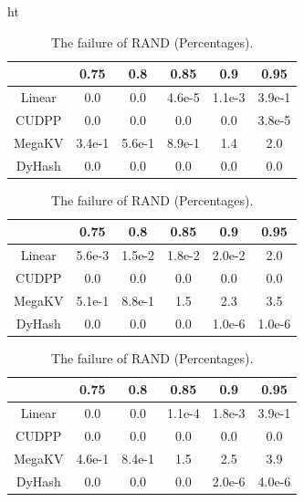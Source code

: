 \begin{table}{ht}\centering
	\begin{minipage}{0.45\linewidth}\centering
		\caption{The failure of TW (Percentages).}
		\begin{tabular}{|c|c|c|c|c|c|}
			\hline
			& 0.75 & 0.8 & 0.85 & 0.9 & 0.95\\ \hline
			Linear &0.0 & 0.0 &4.6e-5  & 1.1e-3 & 3.9e-1 \\ \hline
			CUDPP & 0.0 & 0.0 &0.0  & 0.0 & 3.8e-5 \\ \hline
			MegaKV & 3.4e-1 & 5.6e-1 &8.9e-1 & 1.4 & 2.0 \\ \hline
			DyHash &0.0 & 0.0 &0.0  & 0.0 & 0.0 \\ \hline
		\end{tabular}
		\label{tab:fail:tw}
	\end{minipage}
	\begin{minipage}{0.45\linewidth}\centering
		\caption{The failure of RE (Percentages).}
		\begin{tabular}{|c|c|c|c|c|c|}
			\hline
			& 0.75 & 0.8 & 0.85 & 0.9 & 0.95\\ \hline
			Linear &5.6e-3 & 1.5e-2 &1.8e-2  & 2.0e-2 & 2.0 \\ \hline
			CUDPP & 0.0 & 0.0 &0.0  & 0.0 & 0.0 \\ \hline
			MegaKV &5.1e-1 & 8.8e-1 &1.5  & 2.3 & 3.5 \\ \hline
			DyHash &0.0 & 0.0 &0.0  & 1.0e-6 & 1.0e-6 \\ \hline
		\end{tabular}
		\label{tab:fail:re}
	\end{minipage}
	\begin{minipage}{0.45\linewidth}\centering
		\caption{The failure of LINE (Percentages).}
		\begin{tabular}{|c|c|c|c|c|c|}
			\hline
			& 0.75 & 0.8 & 0.85 & 0.9 & 0.95\\ \hline
			Linear &0.0 & 0.0 &1.1e-4  & 1.8e-3 & 3.9e-1 \\ \hline
			CUDPP & 0.0 & 0.0 &0.0  & 0.0 & 0.0 \\ \hline
			MegaKV &4.6e-1 & 8.4e-1 &1.5  & 2.5 & 3.9 \\ \hline
			DyHash &0.0 & 0.0 &0.0  & 2.0e-6 & 4.0e-6 \\ \hline
		\end{tabular}
		\label{tab:fail:line}
	\end{minipage}
	\begin{minipage}{0.45\linewidth}\centering
		\caption{The failure of RAND (Percentages).}

\end{minipage}
\end{table}
